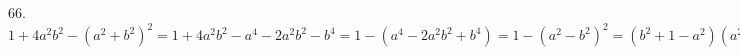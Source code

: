 66. $1+4a^2b^2-(a^2+b^2)^2=1+4a^2b^2-a^4-2a^2b^2-b^4=1-(a^4-2a^2b^2+b^4)=1-(a^2-b^2)^2=(b^2+1-a^2)(a^2-b^2+1).$\\
